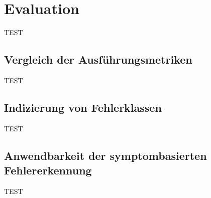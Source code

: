 \chapter{Evaluation}

TEST

\section{Vergleich der Ausführungsmetriken}
TEST

\section{Indizierung von Fehlerklassen}
TEST

\section{Anwendbarkeit der symptombasierten Fehlererkennung}
TEST

